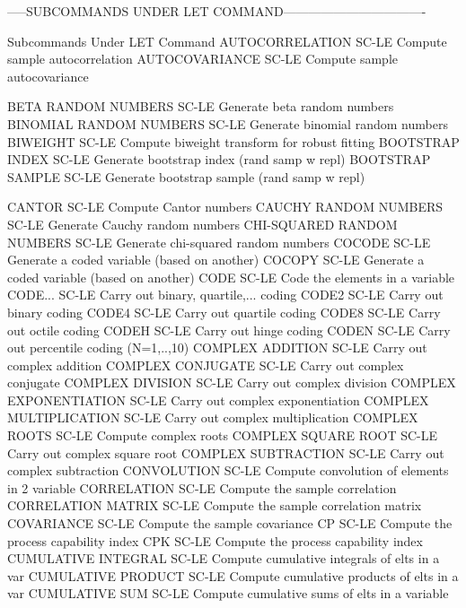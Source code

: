 -----SUBCOMMANDS UNDER LET COMMAND----------------------------------

Subcommands Under LET Command
AUTOCORRELATION             SC-LE Compute sample autocorrelation
AUTOCOVARIANCE              SC-LE Compute sample autocovariance

BETA RANDOM NUMBERS         SC-LE Generate beta random numbers
BINOMIAL RANDOM NUMBERS     SC-LE Generate binomial random numbers
BIWEIGHT                    SC-LE Compute biweight transform for robust fitting
BOOTSTRAP INDEX             SC-LE Generate bootstrap index (rand samp w repl)
BOOTSTRAP SAMPLE            SC-LE Generate bootstrap sample (rand samp w repl)

CANTOR                      SC-LE Compute Cantor numbers
CAUCHY RANDOM NUMBERS       SC-LE Generate Cauchy random numbers
CHI-SQUARED RANDOM NUMBERS  SC-LE Generate chi-squared random numbers
COCODE                      SC-LE Generate a coded variable (based on another)
COCOPY                      SC-LE Generate a coded variable (based on another)
CODE                        SC-LE Code the elements in a variable
CODE...                     SC-LE Carry out binary, quartile,... coding
CODE2                       SC-LE Carry out binary coding
CODE4                       SC-LE Carry out quartile coding
CODE8                       SC-LE Carry out octile coding
CODEH                       SC-LE Carry out hinge coding
CODEN                       SC-LE Carry out percentile coding (N=1,..,10)
COMPLEX ADDITION            SC-LE Carry out complex addition
COMPLEX CONJUGATE           SC-LE Carry out complex conjugate
COMPLEX DIVISION            SC-LE Carry out complex division
COMPLEX EXPONENTIATION      SC-LE Carry out complex exponentiation
COMPLEX MULTIPLICATION      SC-LE Carry out complex multiplication
COMPLEX ROOTS               SC-LE Compute complex roots
COMPLEX SQUARE ROOT         SC-LE Carry out complex square root
COMPLEX SUBTRACTION         SC-LE Carry out complex subtraction
CONVOLUTION                 SC-LE Compute convolution of elements in 2 variable
CORRELATION                 SC-LE Compute the sample correlation
CORRELATION MATRIX          SC-LE Compute the sample correlation matrix
COVARIANCE                  SC-LE Compute the sample covariance
CP                          SC-LE Compute the process capability index
CPK                         SC-LE Compute the process capability index
CUMULATIVE INTEGRAL         SC-LE Compute cumulative integrals of elts in a var
CUMULATIVE PRODUCT          SC-LE Compute cumulative products of elts in a var
CUMULATIVE SUM              SC-LE Compute cumulative sums of elts in a variable

